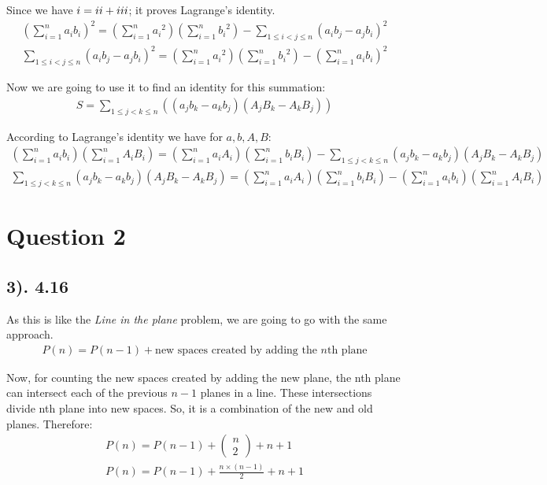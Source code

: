 \documentclass[12pt]{article}
\newcommand{\RNum}[1]{\uppercase\expandafter{\romannumeral #1\relax}}
\begin{document}
Since we have $\RNum{1} = \RNum{2} + \RNum{3}$; it proves Lagrange's identity.
\begin{gather*}
    {(\sum_{i=1}^n a_{i}b_{i})}^2 = (\sum_{i=1}^n {a_{i}}^2)(\sum_{i=1}^n {b_{i}}^2) - \sum_{1 \leq i < j \leq n} {(a_{i}b_{j} - a_{j}b_{i})}^2 \\
    \sum_{1 \leq i < j \leq n} {(a_{i}b_{j} - a_{j}b_{i})}^2 = (\sum_{i=1}^n {a_{i}}^2)(\sum_{i=1}^n {b_{i}}^2) - {(\sum_{i=1}^n a_{i}b_{i})}^2
\end{gather*}

Now we are going to use it to find an identity for this summation:
\begin{gather*}
    S = \sum_{1 \leq j < k \leq n} ((a_{j}b_{k} - a_{k}b_{j})(A_{j}B_{k} - A_{k}B_{j}))
\end{gather*}

According to Lagrange's identity we have for ${a},{b},{A},{B}$:
\begin{gather*}
    (\sum_{i=1}^n a_{i}b_{i})(\sum_{i=1}^n A_{i}B_{i}) = (\sum_{i=1}^n a_{i}A_{i})(\sum_{i=1}^n b_{i}B_{i}) - \sum_{1 \leq j < k \leq n} (a_{j}b_{k} - a_{k}b_{j})(A_{j}B_{k} - A_{k}B_{j}) \\
    \sum_{1 \leq j < k \leq n} (a_{j}b_{k} - a_{k}b_{j})(A_{j}B_{k} - A_{k}B_{j}) = (\sum_{i=1}^n a_{i}A_{i})(\sum_{i=1}^n b_{i}B_{i}) - (\sum_{i=1}^n a_{i}b_{i})(\sum_{i=1}^n A_{i}B_{i})
\end{gather*}

\section*{Question 2}
\subsection*{3). 4.16}
As this is like the \textit{Line in the plane} problem, we are going to go with the same approach.
\begin{gather*}
    P(n) = P(n-1) + \text{new spaces created by adding the $n$th plane}
\end{gather*}

Now, for counting the new spaces created by adding the new plane, the nth plane can intersect each of the previous $n-1$ planes in a line.
These intersections divide nth plane into new spaces. So, it is a combination of the new and old planes. Therefore:
\begin{gather*}
    P(n) = P(n-1) + \begin{pmatrix} n \\ 2 \end{pmatrix} + n + 1 \\
    P(n) = P(n-1) + \frac{n \times (n-1)}{2} + n + 1
\end{gather*}
\end{document}
